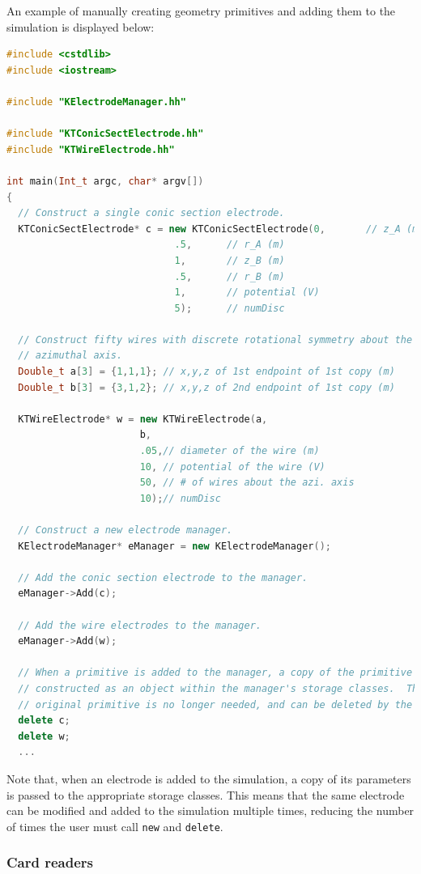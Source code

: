 \documentclass[11pt,a4paper,oneside]{article}
\begin{document}
An example of manually creating geometry primitives and adding them to the simulation is displayed below:
%
\begin{lstlisting}[language=C++]
#include <cstdlib>
#include <iostream>

#include "KElectrodeManager.hh"

#include "KTConicSectElectrode.hh"
#include "KTWireElectrode.hh"

int main(Int_t argc, char* argv[])
{
  // Construct a single conic section electrode.
  KTConicSectElectrode* c = new KTConicSectElectrode(0,       // z_A (m)
						     .5,      // r_A (m)
						     1,       // z_B (m)
						     .5,      // r_B (m)
						     1,       // potential (V)
						     5);      // numDisc

  // Construct fifty wires with discrete rotational symmetry about the
  // azimuthal axis.
  Double_t a[3] = {1,1,1}; // x,y,z of 1st endpoint of 1st copy (m)
  Double_t b[3] = {3,1,2}; // x,y,z of 2nd endpoint of 1st copy (m)
  
  KTWireElectrode* w = new KTWireElectrode(a,
					   b,
					   .05,// diameter of the wire (m)
					   10, // potential of the wire (V)
					   50, // # of wires about the azi. axis
					   10);// numDisc

  // Construct a new electrode manager.
  KElectrodeManager* eManager = new KElectrodeManager();

  // Add the conic section electrode to the manager.
  eManager->Add(c);

  // Add the wire electrodes to the manager.
  eManager->Add(w);

  // When a primitive is added to the manager, a copy of the primitive is
  // constructed as an object within the manager's storage classes.  The
  // original primitive is no longer needed, and can be deleted by the user.
  delete c;
  delete w;
  ...
\end{lstlisting}
%
Note that, when an electrode is added to the simulation, a copy of its parameters is passed to the appropriate storage classes.  This means that the same electrode can be modified and added to the simulation multiple times, reducing the number of times the user must call \texttt{new} and \texttt{delete}.  

\subsubsection{Card readers}
\label{subsubsec:cardReaders}
\end{document}
